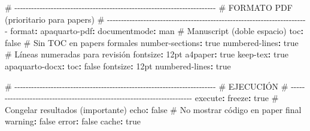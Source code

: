 \documentclass[
  doc,
  floatsintext,
  longtable,
  a4paper,
  nolmodern,
  notxfonts,
  notimes,
  12pt,
  colorlinks=true,linkcolor=blue,citecolor=blue,urlcolor=blue]{apa7}
\newenvironment{Shaded}{\begin{snugshade}}{\end{snugshade}}
\newcommand{\AttributeTok}[1]{\textcolor[rgb]{0.40,0.45,0.13}{#1}}
\newcommand{\CharTok}[1]{\textcolor[rgb]{0.13,0.47,0.30}{#1}}
\newcommand{\CommentTok}[1]{\textcolor[rgb]{0.37,0.37,0.37}{#1}}
\newcommand{\FunctionTok}[1]{\textcolor[rgb]{0.28,0.35,0.67}{#1}}
\newcommand{\KeywordTok}[1]{\textcolor[rgb]{0.00,0.23,0.31}{\textbf{#1}}}
\begin{document}
\begin{Shaded}
\begin{Highlighting}[]
\CommentTok{\# {-}{-}{-}{-}{-}{-}{-}{-}{-}{-}{-}{-}{-}{-}{-}{-}{-}{-}{-}{-}{-}{-}{-}{-}{-}{-}{-}{-}{-}{-}{-}{-}{-}{-}{-}{-}{-}{-}{-}{-}{-}{-}{-}{-}{-}{-}{-}{-}{-}{-}{-}{-}{-}{-}{-}{-}{-}{-}{-}{-}{-}{-}{-}{-}{-}{-}{-}{-}{-}{-}{-}{-}}
\CommentTok{\# FORMATO PDF (prioritario para papers)}
\CommentTok{\# {-}{-}{-}{-}{-}{-}{-}{-}{-}{-}{-}{-}{-}{-}{-}{-}{-}{-}{-}{-}{-}{-}{-}{-}{-}{-}{-}{-}{-}{-}{-}{-}{-}{-}{-}{-}{-}{-}{-}{-}{-}{-}{-}{-}{-}{-}{-}{-}{-}{-}{-}{-}{-}{-}{-}{-}{-}{-}{-}{-}{-}{-}{-}{-}{-}{-}{-}{-}{-}{-}{-}{-}}
\FunctionTok{format}\KeywordTok{:}
\AttributeTok{  }\FunctionTok{apaquarto{-}pdf}\KeywordTok{:}
\AttributeTok{    }\FunctionTok{documentmode}\KeywordTok{:}\AttributeTok{ man}\CommentTok{       \# Manuscript (doble espacio)}
\AttributeTok{    }\FunctionTok{toc}\KeywordTok{:}\AttributeTok{ }\CharTok{false}\CommentTok{              \# Sin TOC en papers formales}
\AttributeTok{    }\FunctionTok{number{-}sections}\KeywordTok{:}\AttributeTok{ }\CharTok{true}
\AttributeTok{    }\FunctionTok{numbered{-}lines}\KeywordTok{:}\AttributeTok{ }\CharTok{true}\CommentTok{    \# Líneas numeradas para revisión}
\AttributeTok{    }\FunctionTok{fontsize}\KeywordTok{:}\AttributeTok{ 12pt}
\AttributeTok{    }\FunctionTok{a4paper}\KeywordTok{:}\AttributeTok{ }\CharTok{true}
\AttributeTok{    }\FunctionTok{keep{-}tex}\KeywordTok{:}\AttributeTok{ }\CharTok{true}
\AttributeTok{    }
\AttributeTok{  }\FunctionTok{apaquarto{-}docx}\KeywordTok{:}
\AttributeTok{    }\FunctionTok{toc}\KeywordTok{:}\AttributeTok{ }\CharTok{false}
\AttributeTok{    }\FunctionTok{fontsize}\KeywordTok{:}\AttributeTok{ 12pt}
\AttributeTok{    }\FunctionTok{numbered{-}lines}\KeywordTok{:}\AttributeTok{ }\CharTok{true}

\CommentTok{\# {-}{-}{-}{-}{-}{-}{-}{-}{-}{-}{-}{-}{-}{-}{-}{-}{-}{-}{-}{-}{-}{-}{-}{-}{-}{-}{-}{-}{-}{-}{-}{-}{-}{-}{-}{-}{-}{-}{-}{-}{-}{-}{-}{-}{-}{-}{-}{-}{-}{-}{-}{-}{-}{-}{-}{-}{-}{-}{-}{-}{-}{-}{-}{-}{-}{-}{-}{-}{-}{-}{-}{-}}
\CommentTok{\# EJECUCIÓN}
\CommentTok{\# {-}{-}{-}{-}{-}{-}{-}{-}{-}{-}{-}{-}{-}{-}{-}{-}{-}{-}{-}{-}{-}{-}{-}{-}{-}{-}{-}{-}{-}{-}{-}{-}{-}{-}{-}{-}{-}{-}{-}{-}{-}{-}{-}{-}{-}{-}{-}{-}{-}{-}{-}{-}{-}{-}{-}{-}{-}{-}{-}{-}{-}{-}{-}{-}{-}{-}{-}{-}{-}{-}{-}{-}}
\FunctionTok{execute}\KeywordTok{:}
\AttributeTok{  }\FunctionTok{freeze}\KeywordTok{:}\AttributeTok{ }\CharTok{true}\CommentTok{              \# Congelar resultados (importante)}
\AttributeTok{  }\FunctionTok{echo}\KeywordTok{:}\AttributeTok{ }\CharTok{false}\CommentTok{               \# No mostrar código en paper final}
\AttributeTok{  }\FunctionTok{warning}\KeywordTok{:}\AttributeTok{ }\CharTok{false}
\AttributeTok{  }\FunctionTok{error}\KeywordTok{:}\AttributeTok{ }\CharTok{false}
\AttributeTok{  }\FunctionTok{cache}\KeywordTok{:}\AttributeTok{ }\CharTok{true}
\end{Highlighting}
\end{Shaded}
\end{document}
